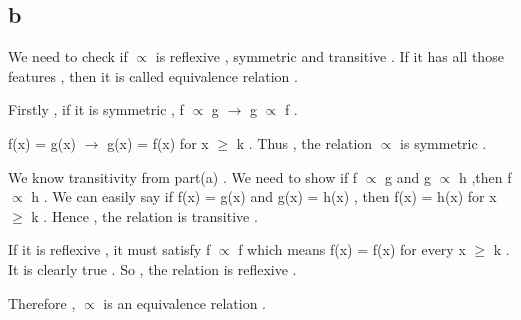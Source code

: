 \documentclass[12pt]{article}
\begin{document}
\subsection*{b}
We need to check if $\propto$ is reflexive , symmetric and transitive . If it has all those features , then it is called equivalence relation . \par 
Firstly , if it is symmetric , f $\propto$ g $\rightarrow$ g $\propto$ f . \par 
f(x) = g(x) $\rightarrow$ g(x) = f(x) for x $\geq$ k . Thus , the relation $\propto$ is symmetric . \par 
We know transitivity from part(a) . We need to show if f $\propto$ g and g $\propto$ h ,then f $\propto$ h . We can easily say if f(x) = g(x) and g(x) = h(x) , then f(x) = h(x) for x $\geq$ k . Hence , the relation is transitive .\par 
If it is reflexive , it must satisfy f $\propto$ f which means f(x) = f(x) for every x $\geq$ k . It is clearly true . So , the relation is reflexive . \par 
Therefore , $\propto$ is an equivalence relation .
\end{document}
